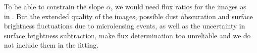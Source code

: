 To be able to constrain the slope $\alpha$, we would need flux ratios for the images as in \citet{GlennEC}. But the extended quality of the images, possible dust obscuration and surface brightness fluctuations due to microlensing events, as well as the uncertainty in surface brightness subtraction, make flux determination too unreliable and we do not include them in the fitting.
